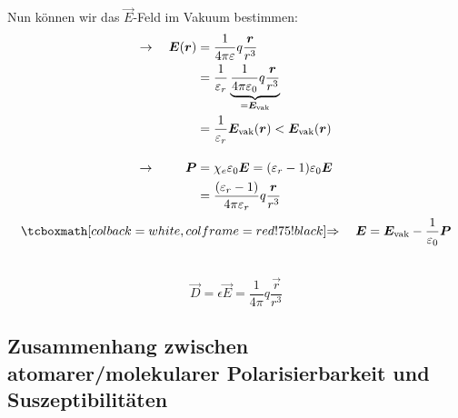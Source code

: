 \noindent
\begin{minipage}{.6\linewidth}
	Nun können wir das $ \vec{E} $-Feld im Vakuum bestimmen:
	\begin{align*}
	\rightarrow \quad \bm{E}(\bm{r}) &= \frac{1}{4 \pi \varepsilon} q \frac{\bm{r}}{r^3} \\
	&= \frac{1}{\varepsilon_r} \underbrace{\frac{1}{4\pi\varepsilon_0} q \frac{\bm{r}}{r^3}}_{= \bm{E}_{\textrm{vak}}}\\
	&= \frac{1}{\varepsilon_r} \bm{E}_{\textrm{vak}} (\bm{r}) < \bm{E}_{\textrm{vak}}(\bm{r})\\[10pt]
	\rightarrow \qquad \ \bm{P} &= \chi_e \varepsilon_0 \bm{E} = (\varepsilon_r - 1) \varepsilon_0 \bm{E}\\
	&= \frac{(\varepsilon_r - 1)}{4 \pi \varepsilon_r} q \frac{\bm{r}}{r^3}
	\end{align*}
	\begin{equation*}
	\rmbox{\Rightarrow \quad \vec{E} = \vec{E}_{\tx{vak}} - \frac{1}{\epsilon_0} \vec{P}}
	\end{equation*}
	\vspace{3pt}
\end{minipage}%
\begin{minipage}{.4\linewidth}
	\centering
\end{minipage}%
\\
\begin{equation*}
\vec{D} = \epsilon \vec{E} = \frac{1}{4 \pi} q \frac{\vec{r}}{r^3}
\end{equation*}

\subsection{Zusammenhang zwischen atomarer/molekularer Polarisierbarkeit und Suszeptibilitäten}

